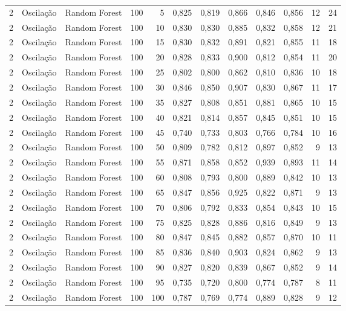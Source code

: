 \begin{longtable}{@{}rllrrrrrrrrr@{}}
2 & Oscilação & Random Forest & 100 & 5 & 0,825 & 0,819 & 0,866 & 0,846 & 0,856 & 12 & 24 \\
2 & Oscilação & Random Forest & 100 & 10 & 0,830 & 0,830 & 0,885 & 0,832 & 0,858 & 12 & 21 \\
2 & Oscilação & Random Forest & 100 & 15 & 0,830 & 0,832 & 0,891 & 0,821 & 0,855 & 11 & 18 \\
2 & Oscilação & Random Forest & 100 & 20 & 0,828 & 0,833 & 0,900 & 0,812 & 0,854 & 11 & 20 \\
2 & Oscilação & Random Forest & 100 & 25 & 0,802 & 0,800 & 0,862 & 0,810 & 0,836 & 10 & 18 \\
2 & Oscilação & Random Forest & 100 & 30 & 0,846 & 0,850 & 0,907 & 0,830 & 0,867 & 11 & 17 \\
2 & Oscilação & Random Forest & 100 & 35 & 0,827 & 0,808 & 0,851 & 0,881 & 0,865 & 10 & 15 \\
2 & Oscilação & Random Forest & 100 & 40 & 0,821 & 0,814 & 0,857 & 0,845 & 0,851 & 10 & 15 \\
2 & Oscilação & Random Forest & 100 & 45 & 0,740 & 0,733 & 0,803 & 0,766 & 0,784 & 10 & 16 \\
2 & Oscilação & Random Forest & 100 & 50 & 0,809 & 0,782 & 0,812 & 0,897 & 0,852 & 9 & 13 \\
2 & Oscilação & Random Forest & 100 & 55 & 0,871 & 0,858 & 0,852 & 0,939 & 0,893 & 11 & 14 \\
2 & Oscilação & Random Forest & 100 & 60 & 0,808 & 0,793 & 0,800 & 0,889 & 0,842 & 10 & 13 \\
2 & Oscilação & Random Forest & 100 & 65 & 0,847 & 0,856 & 0,925 & 0,822 & 0,871 & 9 & 13 \\
2 & Oscilação & Random Forest & 100 & 70 & 0,806 & 0,792 & 0,833 & 0,854 & 0,843 & 10 & 15 \\
2 & Oscilação & Random Forest & 100 & 75 & 0,825 & 0,828 & 0,886 & 0,816 & 0,849 & 9 & 13 \\
2 & Oscilação & Random Forest & 100 & 80 & 0,847 & 0,845 & 0,882 & 0,857 & 0,870 & 10 & 11 \\
2 & Oscilação & Random Forest & 100 & 85 & 0,836 & 0,840 & 0,903 & 0,824 & 0,862 & 9 & 13 \\
2 & Oscilação & Random Forest & 100 & 90 & 0,827 & 0,820 & 0,839 & 0,867 & 0,852 & 9 & 14 \\
2 & Oscilação & Random Forest & 100 & 95 & 0,735 & 0,720 & 0,800 & 0,774 & 0,787 & 8 & 11 \\
2 & Oscilação & Random Forest & 100 & 100 & 0,787 & 0,769 & 0,774 & 0,889 & 0,828 & 9 & 12 \\

\end{longtable}
